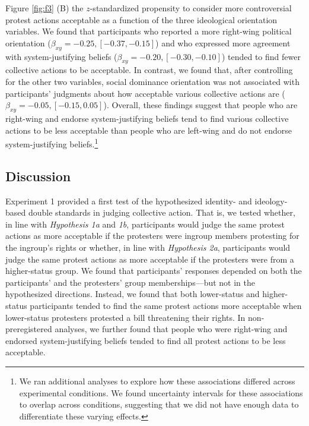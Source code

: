 \documentclass[twocolumn, 11pt, letterpaper]{article}
\begin{document}
Figure \ref{fig:f3} (B) the \(z\)-standardized propensity to consider
more controversial protest actions acceptable as a function of the three
ideological orientation variables. We found that participants who
reported a more right-wing political orientation
(\(\beta_{xy} = -0.25, [-0.37, -0.15]\)) and who expressed more
agreement with system-justifying beliefs
(\(\beta_{xy} = -0.20, [-0.30, -0.10]\)) tended to find fewer collective
actions to be acceptable. In contrast, we found that, after controlling
for the other two variables, social dominance orientation was not
associated with participants' judgments about how acceptable various
collective actions are (\(\beta_{xy} = -0.05, [-0.15, 0.05]\)). Overall,
these findings suggest that people who are right-wing and endorse
system-justifying beliefs tend to find various collective actions to be
less acceptable than people who are left-wing and do not endorse
system-justifying beliefs.\footnote{We ran additional analyses to
  explore how these associations differed across experimental
  conditions. We found uncertainty intervals for these associations to
  overlap across conditions, suggesting that we did not have enough data
  to differentiate these varying effects.}

\hypertarget{discussion}{%
\subsection{Discussion}\label{discussion}}

Experiment 1 provided a first test of the hypothesized identity- and
ideology-based double standards in judging collective action. That is,
we tested whether, in line with \emph{Hypothesis 1a} and \emph{1b},
participants would judge the same protest actions as more acceptable if
the protesters were ingroup members protesting for the ingroup's rights
or whether, in line with \emph{Hypothesis 2a}, participants would judge
the same protest actions as more acceptable if the protesters were from
a higher-status group. We found that participants' responses depended on
both the participants' and the protesters' group memberships---but not
in the hypothesized directions. Instead, we found that both lower-status
and higher-status participants tended to find the same protest actions
more acceptable when lower-status protesters protested a bill
threatening their rights. In non-preregistered analyses, we further
found that people who were right-wing and endorsed system-justifying
beliefs tended to find all protest actions to be less acceptable.
\end{document}
